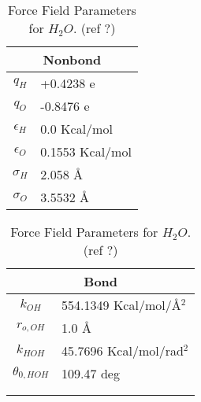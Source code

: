 \documentclass[twoside,english]{uiofysmaster}
\begin{document}
\begin{table}
 \caption{Force Field Parameters for $H_2O$. (ref ?) }
  \begin{tabular}[]{|c|l|}
  \hline
  \multicolumn{2}{|c|}{Nonbond} \\ \hline
  $q_H$ & +0.4238 e  \\ \hline
  $q_O$ & -0.8476 e  \\ \hline
  $\epsilon _H$ & 0.0 Kcal/mol \\ \hline
  $\epsilon _O$ & 0.1553 Kcal/mol \\ \hline
  $\sigma _H$ & 2.058 \AA{} \\ \hline
  $\sigma _O$ & 3.5532 \AA{} \\ \hline
 \end{tabular}
  \begin{tabular}[]{|c|l|}
  \hline
  \multicolumn{2}{|c|}{Bond} \\ \hline
  $k_{OH}$ & 554.1349 Kcal/mol/\AA{}$^2$  \\ \hline
  $r_{o,OH}$ & 1.0 \AA{}  \\ \hline
  $k_{HOH}$ & 45.7696 Kcal/mol/rad$^2$ \\ \hline
  $\theta _{0,HOH}$ & 109.47 deg \\ \hline
                    &           \\ \hline
                    &           \\ \hline

 \end{tabular}
 \label{table:ForceFieldParameters_H2O}
\end{table}
\end{document}
